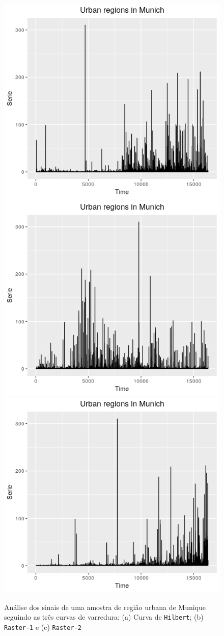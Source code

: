 \documentclass[remotesensing,article,submit,moreauthors,pdftex,10pt,a4paper]{Definitions/mdpi}
\begin{document}
	\begin{figure}[!h]
		\centering
		\includegraphics[width=.3\linewidth]{Figures/munichhilbert.png}
		\includegraphics[width=.3\linewidth]{Figures/munichraster1.png}
		\includegraphics[width=.3\linewidth]{Figures/munichraster2.png}
		\caption{Análise dos sinais de uma amostra de região urbana de Munique seguindo as três curvas de varredura: (a) Curva de \texttt{Hilbert}; (b) \texttt{Raster-1} e (c) \texttt{Raster-2}}\label{fig:sinaisSAR}
	\end{figure}
	
\end{document}
